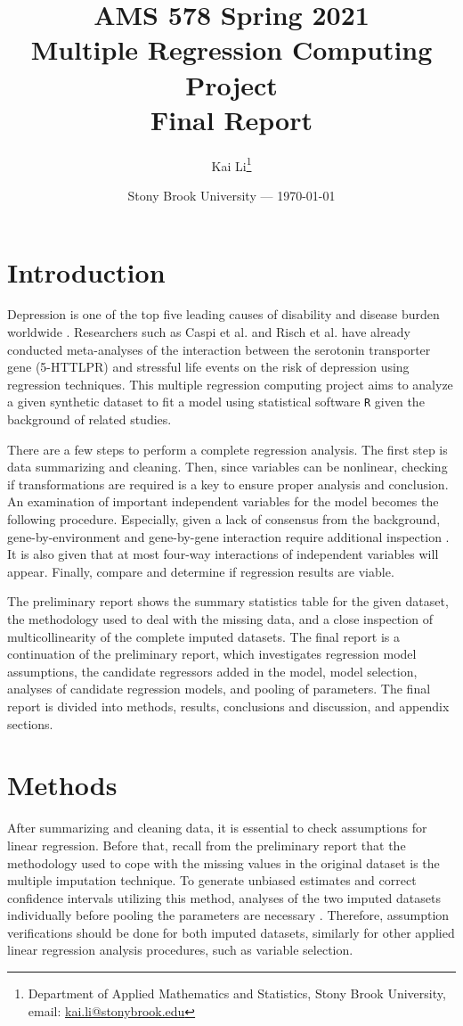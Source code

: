 \documentclass[11pt]{article}
\title{AMS 578 Spring 2021\\Multiple Regression Computing Project\\Final Report}
\author{
  Kai Li\thanks{Department of Applied Mathematics and Statistics, Stony Brook University, email: \href{mailto:kai.li@stonybrook.edu}{kai.li@stonybrook.edu}}
}
\date{Stony Brook University --- \today}
\begin{document}
\maketitle

\section{Introduction}
Depression is one of the top five leading causes of disability and disease burden worldwide \cite{ar:caspi}. Researchers such as Caspi et al. \cite{ar:caspi} and Risch et al. \cite{ar:risch} have already conducted meta-analyses of the interaction between the serotonin transporter gene (5-HTTLPR) and stressful life events on the risk of depression using regression techniques. This multiple regression computing project aims to analyze a given synthetic dataset to fit a model using statistical software \texttt{R} given the background of related studies.

There are a few steps to perform a complete regression analysis. The first step is data summarizing and cleaning. Then, since variables can be nonlinear, checking if transformations are required is a key to ensure proper analysis and conclusion. An examination of important independent variables for the model becomes the following procedure. Especially, given a lack of consensus from the background, gene-by-environment and gene-by-gene interaction require additional inspection \cite{ar:caspi, ar:risch}. It is also given that at most four-way interactions of independent variables will appear. Finally, compare and determine if regression results are viable.

The preliminary report shows the summary statistics table for the given dataset, the methodology used to deal with the missing data, and a close inspection of multicollinearity of the complete imputed datasets. The final report is a continuation of the preliminary report, which investigates regression model assumptions, the candidate regressors added in the model, model selection, analyses of candidate regression models, and pooling of parameters. The final report is divided into methods, results, conclusions and discussion, and appendix sections.

\section{Methods}
After summarizing and cleaning data, it is essential to check assumptions for linear regression. Before that, recall from the preliminary report that the methodology used to cope with the missing values in the original dataset is the multiple imputation technique. To generate unbiased estimates and correct confidence intervals utilizing this method, analyses of the two imputed datasets individually before pooling the parameters are necessary \cite{bk:buuren, ar:raghunathan}. Therefore, assumption verifications should be done for both imputed datasets, similarly for other applied linear regression analysis procedures, such as variable selection.
\end{document}
